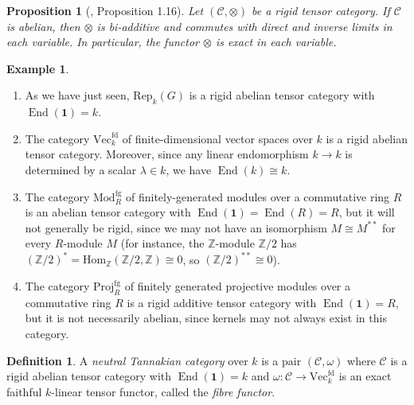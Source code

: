 \documentclass[10pt]{amsart}
\numberwithin{equation}{section}
\def\~#1{\mathscr{#1}}
\newcommand{\Z}{\mathbb{Z}}
\newcommand{\fg}{\mathrm{fg}}
\newcommand{\Proj}{\mathrm{Proj}}
\newcommand{\fd}{\mathrm{fd}}
\newcommand{\Hom}{\mathrm{Hom}}
\DeclareMathOperator{\End}{End}
\renewcommand{\Vec}{\mathrm{Vec}}
\newcommand{\Rep}{\mathrm{Rep}}
\newcommand{\Mod}{\mathrm{Mod}}
\theoremstyle{plain}
\newtheorem{prop}[thm]{Proposition}
\theoremstyle{definition}
\newtheorem{defn}[thm]{Definition}
\newtheorem{ex}[thm]{Example}
\theoremstyle{remark}
\begin{document}
\begin{prop}[\cite{deligne1982tannakian}, Proposition 1.16]
    Let $(\~C, \otimes)$ be a rigid tensor category. If $\~C$ is abelian, then $\otimes$ is bi-additive and commutes with direct and inverse limits in each variable. In particular, the functor $\otimes$ is exact in each variable.
\end{prop}
    \begin{ex}\hfill
        \begin{enumerate}
            \item As we have just seen, $\Rep_k(G)$ is a rigid abelian tensor category with $\End(\mathbf{1}) = k$. 

            \item The category $\Vec^\fd_k$ of finite-dimensional vector spaces over $k$ is a rigid abelian tensor category. Moreover, since any linear endomorphism $k \to k$ is determined by a scalar $\lambda \in k$, we have $\End(k) \cong k$.
            \item The category $\Mod^\fg_R$ of finitely-generated modules over a commutative ring $R$ is an abelian tensor category with $\End(\mathbf{1}) = \End(R) = R$, but it will not generally be rigid, since we may not have an isomorphism $M \cong M^{**}$ for every $R$-module $M$ (for instance, the $\Z$-module $\Z/2$ has $(\Z/2)^* = \Hom_\Z(\Z/2, \Z) \cong 0$, so $(\Z/2)^{**} \cong 0$).
            \item The category $\Proj_R^\fg$ of finitely generated projective modules over a commutative ring $R$ is a rigid additive tensor category with $\End(\mathbf{1}) = R$, but it is not necessarily abelian, since kernels may not always exist in this category. 
        \end{enumerate}
    \end{ex}
\begin{defn}
    A \emph{neutral Tannakian category} over $k$ is a pair $(\~C, \omega)$ where $\~C$ is a rigid abelian tensor category with $\End(\mathbf{1}) = k$ and $\omega: \~C \to \Vec^\fd_k$ is an exact faithful $k$-linear tensor functor, called the \emph{fibre functor}.
\end{defn}
\end{document}
